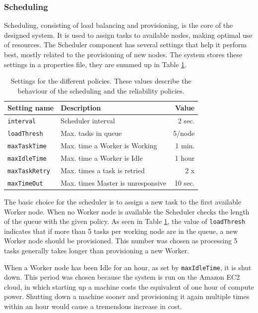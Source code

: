 \documentclass{acm_proc_article-sp}
\begin{document}
\subsubsection{Scheduling}
Scheduling, consisting of load balancing and provisioning, is the core of the designed system.
It is used to assign tasks to available nodes, making optimal use of resources.
The Scheduler component has several settings that help it perform best, mostly related to the provisioning of new nodes.
The system stores these settings in a properties file, they are summed up in Table \ref{tbl:policy}.

\begin{table}
	\centering
	\begin{tabular}{| l | l | r |}
		\hline
		Setting name & Description & Value \\ \hline \hline
		\texttt{interval} & Scheduler interval & 2 sec. \\ \hline
		\texttt{loadThresh} & Max. tasks in queue & 5/node \\ \hline
		\texttt{maxTaskTime} & Max. time a Worker is Working & 1 min. \\ \hline
		\texttt{maxIdleTime} & Max. time a Worker is Idle & 1 hour \\ \hline
		\texttt{maxTaskRetry} & Max. times a task is retried & 2 x\\ \hline
		\texttt{maxTimeOut} & Max. times Master is unresponsive & 10 sec. \\ \hline
	\end{tabular}
	\caption{Settings for the different policies. These values describe the behaviour of the scheduling and the reliability policies.}
	\label{tbl:policy}
\end{table}

The basic choice for the scheduler is to assign a new task to the first available Worker node.
When no Worker node is available the Scheduler checks the length of the queue with the given policy.
As seen in Table \ref{tbl:policy}, the value of \texttt{loadThresh} indicates that if more than 5 tasks per working node are in the queue, a new Worker node should be provisioned.
This number was chosen as processing 5 tasks generally takes longer than provisioning a new Worker.

When a Worker node has been Idle for an hour, as set by \texttt{maxIdleTime}, it is shut down.
This period was chosen because the system is run on the Amazon EC2 cloud, in which starting up a machine costs the equivalent of one hour of compute power.
Shutting down a machine sooner and provisioning it again multiple times within an hour would cause a tremendous increase in cost.
\end{document}
